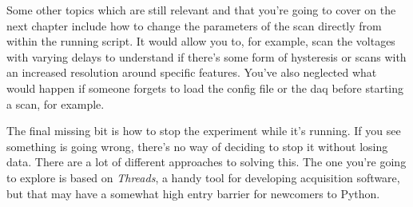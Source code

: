 Some other topics which are still relevant and that you're going to cover on the next chapter include how to change the parameters of the scan directly from within the running script. It would allow you to, for example, scan the voltages with varying delays to understand if there's some form of hysteresis or scans with an increased resolution around specific features. You've also neglected what would happen if someone forgets to load the config file or the daq before starting a scan, for example.

The final missing bit is how to stop the experiment while it's running. If you see something is going wrong, there's no way of deciding to stop it without losing data. There are a lot of different approaches to solving this. The one you're going to explore is based on \emph{Threads}, a handy tool for developing acquisition software, but that may have a somewhat high entry barrier for newcomers to Python.
